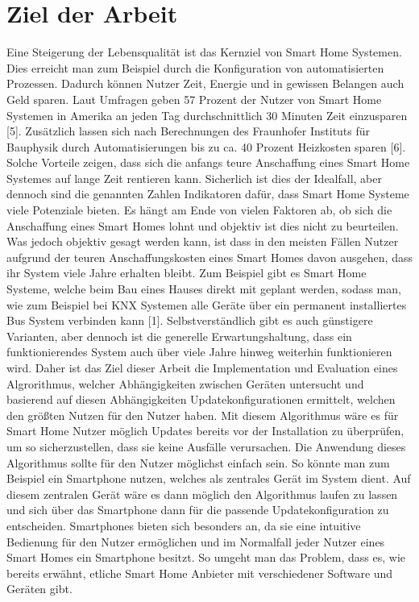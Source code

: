 \section{Ziel der Arbeit}

Eine Steigerung der Lebensqualität ist das Kernziel von Smart Home Systemen. Dies erreicht man zum Beispiel durch die Konfiguration von 
automatisierten Prozessen. Dadurch können Nutzer Zeit, Energie und in gewissen Belangen auch Geld sparen. Laut Umfragen geben 57 Prozent der Nutzer von
Smart Home Systemen in Amerika an jeden Tag durchschnittlich 30 Minuten Zeit einzusparen [5].
Zusätzlich lassen sich nach Berechnungen des Fraunhofer Instituts für Bauphysik  durch Automatisierungen bis zu ca. 40 Prozent Heizkosten 
sparen [6].
Solche Vorteile zeigen, dass sich die anfangs teure Anschaffung eines Smart Home Systemes auf lange Zeit rentieren kann. Sicherlich 
ist dies der Idealfall, aber dennoch sind die genannten Zahlen Indikatoren dafür, dass Smart Home Systeme viele Potenziale bieten. Es hängt am Ende von 
vielen Faktoren ab, ob sich die Anschaffung eines Smart Homes lohnt und objektiv ist dies nicht zu beurteilen. Was jedoch 
objektiv gesagt werden kann, ist dass in den meisten Fällen Nutzer aufgrund der teuren Anschaffungskosten eines Smart Homes davon ausgehen, dass 
ihr System viele Jahre erhalten bleibt. Zum Beispiel gibt es Smart Home Systeme, welche beim Bau eines Hauses direkt mit geplant werden,
sodass man, wie zum Beispiel bei KNX Systemen alle Geräte über ein permanent installiertes Bus System verbinden kann [1].
Selbstverständlich gibt es auch günstigere Varianten, aber dennoch ist die generelle Erwartungshaltung, dass ein funktionierendes System
auch über viele Jahre hinweg weiterhin funktionieren wird.
Daher ist das Ziel dieser Arbeit die Implementation und Evaluation eines Algrorithmus, welcher 
Abhängigkeiten zwischen Geräten untersucht und basierend auf diesen Abhängigkeiten Updatekonfigurationen 
ermittelt, welchen den größten Nutzen für den Nutzer haben.
Mit diesem Algorithmus wäre es für Smart Home Nutzer möglich Updates bereits vor der Installation zu überprüfen, um so sicherzustellen, 
dass sie keine Ausfälle verursachen. Die Anwendung dieses Algorithmus sollte für den Nutzer möglichst einfach sein. So könnte man zum 
Beispiel ein Smartphone nutzen, welches als zentrales Gerät im System dient. Auf diesem zentralen Gerät wäre es dann möglich den 
Algorithmus laufen zu lassen und sich über das Smartphone dann für die passende Updatekonfiguration zu entscheiden. Smartphones
bieten sich besonders an, da sie eine intuitive Bedienung für den Nutzer ermöglichen und im Normalfall jeder Nutzer eines Smart Homes
ein Smartphone besitzt. So umgeht man das Problem, dass es, wie bereits erwähnt, etliche Smart Home Anbieter mit verschiedener
Software und Geräten gibt. 


